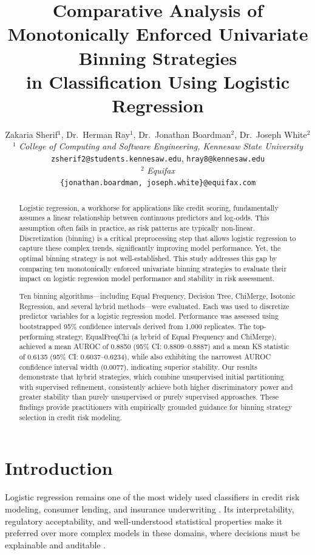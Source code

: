 \documentclass[11pt]{article}
\title{Comparative Analysis of Monotonically Enforced Univariate Binning Strategies \\
in Classification Using Logistic Regression}
\author{
Zakaria Sherif$^{1}$, Dr.~Herman Ray$^{1}$, Dr.~Jonathan Boardman$^{2}$, Dr.~Joseph White$^{2}$ \\[1ex]
$^{1}$ \textit{College of Computing and Software Engineering, Kennesaw State University} \\
\texttt{zsherif2@students.kennesaw.edu}, \texttt{hray8@kennesaw.edu} \\[1ex]
$^{2}$ \textit{Equifax} \\
\texttt{\{jonathan.boardman, joseph.white\}@equifax.com}
}
\date{}
\begin{document}
\maketitle

\begin{abstract}
Logistic regression, a workhorse for applications like credit scoring, fundamentally assumes a linear relationship between continuous predictors and log-odds. This assumption often fails in practice, as risk patterns are typically non-linear. Discretization (binning) is a critical preprocessing step that allows logistic regression to capture these complex trends, significantly improving model performance. Yet, the optimal binning strategy is not well-established. This study addresses this gap by comparing ten monotonically enforced univariate binning strategies to evaluate their impact on logistic regression model performance and stability in risk assessment.

Ten binning algorithms---including Equal Frequency, Decision Tree, ChiMerge, Isotonic Regression, and several hybrid methods---were evaluated. Each was used to discretize predictor variables for a logistic regression model. Performance was assessed using bootstrapped 95\% confidence intervals derived from 1{,}000 replicates. The top-performing strategy, EqualFreqChi (a hybrid of Equal Frequency and ChiMerge), achieved a mean AUROC of 0.8850 (95\% CI: 0.8809--0.8887) and a mean KS statistic of 0.6135 (95\% CI: 0.6037--0.6234), while also exhibiting the narrowest AUROC confidence interval width (0.0077), indicating superior stability. Our results demonstrate that hybrid strategies, which combine unsupervised initial partitioning with supervised refinement, consistently achieve both higher discriminatory power and greater stability than purely unsupervised or purely supervised approaches. These findings provide practitioners with empirically grounded guidance for binning strategy selection in credit risk modeling.
\end{abstract}

\section{Introduction}
\label{sec:intro}

Logistic regression remains one of the most widely used classifiers in credit risk modeling, consumer lending, and insurance underwriting \citep{hosmer2013applied, thomas2017credit}. Its interpretability, regulatory acceptability, and well-understood statistical properties make it preferred over more complex models in these domains, where decisions must be explainable and auditable \citep{siddiqi2012credit, anderson2007credit}.
\end{document}
